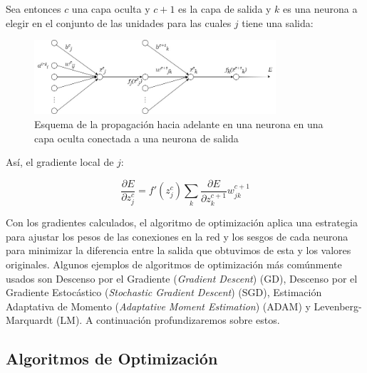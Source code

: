 Sea entonces $c$ una capa oculta y $c+1$ es la capa de salida y $k$ es una neurona a elegir en el conjunto de las unidades para las cuales $j$ tiene una salida:

\begin{figure}[H]
    \centering
    \includegraphics[width=0.8\textwidth]{Figuras/redes_neuronales/Feed-forward 2 neuronas.jpg}
    \caption{Esquema de la propagación hacia adelante en una neurona en una capa oculta conectada a una neurona de salida} 
    \label{fig:Feed-forward2}
\end{figure}

Así, el gradiente local de $j$:

\[
\dfrac{\partial E}{\partial z_{j}^{c}} = f'(z^c_j)\sum_{k} \dfrac{\partial E}{\partial z_{k}^{c+1}} w^{c+1}_{jk}
\]

Con los gradientes calculados, el algoritmo de optimización aplica una estrategia para ajustar los pesos de las conexiones en la red y los sesgos de cada neurona para minimizar la diferencia entre la salida que obtuvimos de esta y los valores originales. Algunos ejemplos de algoritmos de optimización más comúnmente usados son Descenso por el Gradiente (\textit{Gradient Descent}) (GD), Descenso por el Gradiente Estocástico (\textit{Stochastic Gradient Descent}) (SGD), Estimación Adaptativa de Momento (\textit{Adaptative Moment Estimation}) (ADAM) y Levenberg-Marquardt (LM). A continuación profundizaremos sobre estos. 

\subsection{Algoritmos de Optimización}

